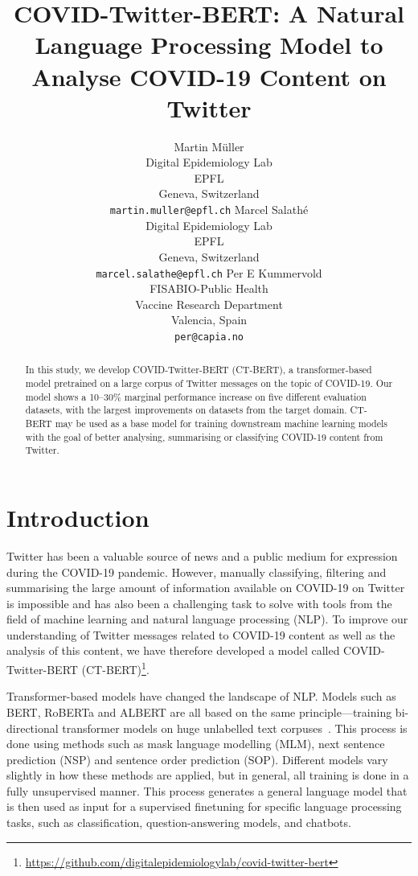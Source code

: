 \documentclass{article}
\title{COVID-Twitter-BERT: A Natural Language Processing Model to Analyse COVID-19 Content on Twitter}
\author{
  Martin M\"uller \\
  Digital Epidemiology Lab \\
  EPFL \\
  Geneva, Switzerland \\
  \texttt{martin.muller@epfl.ch}
    \And
  Marcel Salathé \\
  Digital Epidemiology Lab \\
  EPFL \\
  Geneva, Switzerland \\
  \texttt{marcel.salathe@epfl.ch}
    \AND
  Per E Kummervold \\
  FISABIO-Public Health \\
  Vaccine Research Department \\
  Valencia, Spain \\
  \texttt{per@capia.no}
}
\begin{document}
\maketitle

\begin{abstract}
  In this study, we develop COVID-Twitter-BERT (\textsc{CT-BERT}), a transformer-based model pretrained on a large corpus of Twitter messages on the topic of COVID-19.
  Our model shows a \numrange{10}{30}\% marginal performance increase on five different evaluation datasets, with the largest improvements on datasets from the target domain.
  \textsc{CT-BERT} may be used as a base model for training downstream machine learning models with the goal of better analysing, summarising or classifying COVID-19 content from Twitter.
\end{abstract}




\section{Introduction}
\label{sec:introduction}
Twitter has been a valuable source of news and a public medium for expression during the COVID-19 pandemic.
However, manually classifying, filtering and summarising the large amount of information available on COVID-19 on Twitter is impossible and has also been a challenging task to solve with tools from the field of machine learning and natural language processing (NLP).
To improve our understanding of Twitter messages related to COVID-19 content as well as the analysis of this content, we have therefore developed a model called COVID-Twitter-BERT (\textsc{CT-BERT})\footnote{\url{https://github.com/digitalepidemiologylab/covid-twitter-bert}}.

Transformer-based models have changed the landscape of NLP.
Models such as BERT, RoBERTa and ALBERT are all based on the same principle—training bi-directional transformer models on huge unlabelled text corpuses~\cite{vaswani2017attention,devlin2018bert,liu2019roberta,lan2019albert}.
This process is done using methods such as mask language modelling (MLM), next sentence prediction (NSP) and sentence order prediction (SOP).
Different models vary slightly in how these methods are applied, but in general, all training is done in a fully unsupervised manner.
This process generates a general language model that is then used as input for a supervised finetuning for specific language processing tasks, such as classification, question-answering models, and chatbots.\par
\end{document}
